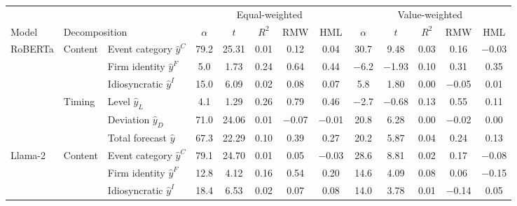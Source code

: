 \begin{table}[htbp]
{\footnotesize
\begin{adjustbox}{max width=\linewidth, max totalheight=0.75\textheight}
\begin{tabular}{lllcccccccccc}
\toprule
\multicolumn{3}{c}{} & \multicolumn{5}{c}{Equal-weighted} & \multicolumn{5}{c}{Value-weighted} \\
\cmidrule(lr){4-8} \cmidrule(lr){9-13}
Model & \multicolumn{2}{l}{Decomposition} & $\alpha$ & $t$ & $R^2$ & RMW & HML & $\alpha$ & $t$ & $R^2$ & RMW & HML \\
\midrule
RoBERTa & Content & Event category $\hat y^C$ & 79.2 & 25.31 & 0.01 & \phantom{$-$}0.12 & \phantom{$-$}0.04 & \phantom{$-$}30.7 & \phantom{$-$}9.48 & 0.03 & \phantom{$-$}0.16 & $-$0.03 \\
 &  & Firm identity $\hat y^F$ & \phantom{0}5.0 & \phantom{0}1.73 & 0.24 & \phantom{$-$}0.64 & \phantom{$-$}0.44 & \phantom{0}$-$6.2 & $-$1.93 & 0.10 & \phantom{$-$}0.31 & \phantom{$-$}0.35 \\
 &  & Idiosyncratic $\hat y^I$ & 15.0 & \phantom{0}6.09 & 0.02 & \phantom{$-$}0.08 & \phantom{$-$}0.07 & \phantom{$-$0}5.8 & \phantom{$-$}1.80 & 0.00 & $-$0.05 & \phantom{$-$}0.01 \\
\cmidrule(lr){2-13}
 & Timing & Level $\hat y_L$ & \phantom{0}4.1 & \phantom{0}1.29 & 0.26 & \phantom{$-$}0.79 & \phantom{$-$}0.46 & \phantom{0}$-$2.7 & $-$0.68 & 0.13 & \phantom{$-$}0.55 & \phantom{$-$}0.11 \\
 &  & Deviation $\hat y_D$ & 71.0 & 24.06 & 0.01 & $-$0.07 & $-$0.01 & \phantom{$-$}20.8 & \phantom{$-$}6.28 & 0.00 & $-$0.02 & \phantom{$-$}0.00 \\
\cmidrule(lr){2-13}
 &  & Total forecast $\hat y$ & 67.3 & 22.29 & 0.10 & \phantom{$-$}0.39 & \phantom{$-$}0.27 & \phantom{$-$}20.2 & \phantom{$-$}5.87 & 0.04 & \phantom{$-$}0.24 & \phantom{$-$}0.13 \\
\midrule
Llama-2 & Content & Event category $\hat y^C$ & 79.1 & 24.70 & 0.01 & \phantom{$-$}0.05 & $-$0.03 & \phantom{$-$}28.6 & \phantom{$-$}8.81 & 0.02 & \phantom{$-$}0.17 & $-$0.08 \\
 &  & Firm identity $\hat y^F$ & 12.8 & \phantom{0}4.12 & 0.16 & \phantom{$-$}0.54 & \phantom{$-$}0.20 & \phantom{$-$}14.6 & \phantom{$-$}4.09 & 0.08 & \phantom{$-$}0.06 & $-$0.15 \\
 &  & Idiosyncratic $\hat y^I$ & 18.4 & \phantom{0}6.53 & 0.02 & \phantom{$-$}0.07 & \phantom{$-$}0.08 & \phantom{$-$}14.0 & \phantom{$-$}3.78 & 0.01 & $-$0.14 & \phantom{$-$}0.05 \\
\cmidrule(lr){2-13}

\end{tabular}
\end{adjustbox}}
\end{table}
